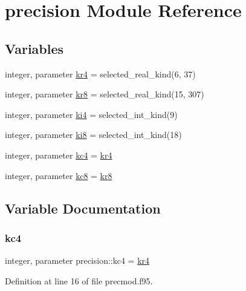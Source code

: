 \hypertarget{namespaceprecision}{}\section{precision Module Reference}
\label{namespaceprecision}
\subsection*{Variables}
\begin{DoxyCompactItemize}
\item 
integer, parameter \hyperlink{namespaceprecision_ae184f50eb0c9c763233e9c5d34b8034a}{kr4} = selected\+\_\+real\+\_\+kind(6, 37)
\item 
integer, parameter \hyperlink{namespaceprecision_a4b30cd5919aba1303b7b752110b57254}{kr8} = selected\+\_\+real\+\_\+kind(15, 307)
\item 
integer, parameter \hyperlink{namespaceprecision_a7b97657c46b1524ed5f73ffc1226dc08}{ki4} = selected\+\_\+int\+\_\+kind(9)
\item 
integer, parameter \hyperlink{namespaceprecision_a25d156062c1ee160ed75a5a6dced7ceb}{ki8} = selected\+\_\+int\+\_\+kind(18)
\item 
integer, parameter \hyperlink{namespaceprecision_a6a58f4fab509ea84cc60d30e25bcb1ca}{kc4} = \hyperlink{namespaceprecision_ae184f50eb0c9c763233e9c5d34b8034a}{kr4}
\item 
integer, parameter \hyperlink{namespaceprecision_a2093064d9b44820731402869509b1a0d}{kc8} = \hyperlink{namespaceprecision_a4b30cd5919aba1303b7b752110b57254}{kr8}
\end{DoxyCompactItemize}


\subsection{Variable Documentation}
\mbox{\label{namespaceprecision_a6a58f4fab509ea84cc60d30e25bcb1ca}} 
\subsubsection{\texorpdfstring{kc4}{kc4}}
{\footnotesize\ttfamily integer, parameter precision\+::kc4 = \hyperlink{namespaceprecision_ae184f50eb0c9c763233e9c5d34b8034a}{kr4}}



Definition at line 16 of file precmod.\+f95.

